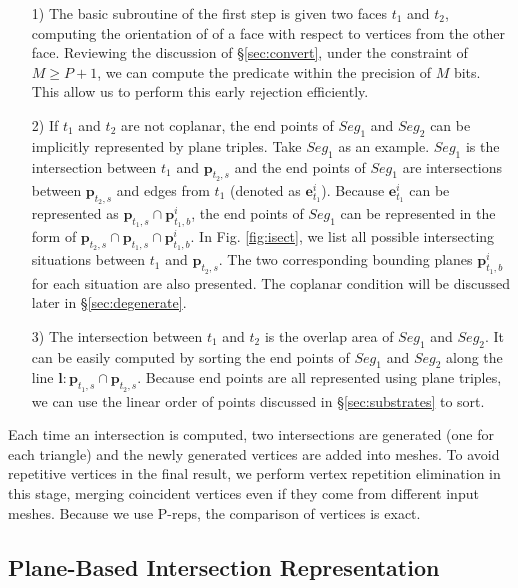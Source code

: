 \documentclass[10pt,journal,compsoc]{IEEEtran}
\begin{document}
\begin{itemize}[leftmargin=0.45cm]
  \item[1)] The basic subroutine of the first step is given two faces $t_1$ and $t_2$, computing the orientation of of a face with respect to vertices from the other face. Reviewing the discussion of \S \ref{sec:convert}, under the constraint of $M \ge P+1$, we can compute the predicate within the precision of $M$ bits. This allow us to perform this early rejection efficiently.
      \vspace{0.5em}
  \item[2)] If $t_1$ and $t_2$ are not coplanar, the end points of $Seg_1$ and $Seg_2$ can be implicitly represented by plane triples. Take $Seg_1$ as an example. $Seg_1$ is the intersection between $t_1$ and $\bm{p}_{t_2, s}$ and the end points of $Seg_1$ are intersections between $\bm{p}_{t_2, s}$ and edges from $t_1$ (denoted as $\bm{e}^i_{t_1}$). Because $\bm{e}^i_{t_1}$ can be represented as $\bm{p}_{t_1, s}\cap \bm{p}^i_{t_1, b}$, the end points of $Seg_1$ can be represented in the form of $\bm{p}_{t_2, s} \cap \bm{p}_{t_1, s} \cap \bm{p}^i_{t_1, b}$. In Fig. \ref{fig:isect}, we list all possible intersecting situations between $t_1$ and $\bm{p}_{t_2, s}$. The two corresponding bounding planes $\bm{p}^i_{t_1, b}$ for each situation are also presented. The coplanar condition will be discussed later in \S \ref{sec:degenerate}.
      \vspace{0.5em}
 \item[3)] The intersection between $t_1$ and $t_2$ is the overlap area of $Seg_1$ and $Seg_2$. It can be easily computed by sorting the end points of $Seg_1$ and $Seg_2$ along the line $\bm{l}\colon \bm{p}_{t_1, s} \cap \bm{p}_{t_2, s}$. Because end points are all represented using plane triples, we can use the linear order of points discussed in \S \ref{sec:substrates} to sort.
\end{itemize}

Each time an intersection is computed, two intersections are generated (one for each triangle) and the newly generated vertices are added into meshes. To avoid repetitive vertices in the final result, we perform vertex repetition elimination in this stage, merging coincident vertices even if they come from different input meshes. Because we use P-reps, the comparison of vertices is exact.

\subsection{Plane-Based Intersection Representation}
\label{sec:ir}
\end{document}
